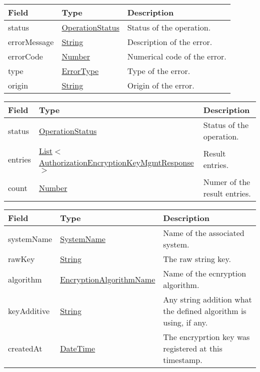 \documentclass[a4paper]{arrowhead}
\newcommand{\pref}[1]{{\textcolor{ArrowheadGrey}{\hyperref[sec:model:primitives:#1]{#1}}}}
\begin{document}

\begin{table}[ht!]
\begin{tabularx}{\textwidth}{| p{4.25cm} | p{3.5cm} | X |} \hline
\rowcolor{gray!33} Field & Type      & Description \\ \hline
status & \pref{OperationStatus} & Status of the operation. \\ \hline
errorMessage & \pref{String} & Description of the error. \\ \hline
errorCode &\pref{Number}  & Numerical code of the error. \\ \hline
type & \pref{ErrorType} & Type of the error. \\ \hline
origin & \pref{String} & Origin of the error. \\ \hline
\end{tabularx}
\end{table}


\begin{table}[ht!]
\begin{tabularx}{\textwidth}{| p{2cm} | p{7.8cm} | X |} \hline
\rowcolor{gray!33} Field & Type & Description \\ \hline
status & \pref{OperationStatus} & Status of the operation. \\ \hline
entries & \pref{List}$<$\hyperref[sec:model:AuthorizationEncryptionKeyMgmtResponse]{AuthorizationEncryptionKeyMgmtResponse}$>$ & Result entries. \\ \hline
count & \pref{Number} & Numer of the result entries. \\ \hline
\end{tabularx}
\end{table}

\clearpage


\begin{table}[ht!]
\begin{tabularx}{\textwidth}{| p{4.25cm} | p{4.5cm} | X |} \hline
\rowcolor{gray!33} Field & Type & Description \\ \hline
systemName & \pref{SystemName} & Name of the associated system. \\ \hline
rawKey & \pref{String} & The raw string key. \\ \hline
algorithm & \pref{EncryptionAlgorithmName} & Name of the ecnryption algorithm. \\ \hline
keyAdditive & \pref{String} & Any string addition what the defined algorithm is using, if any. \\ \hline
createdAt & \pref{DateTime} & The encryprtion key was registered at this timestamp. \\ \hline
\end{tabularx}
\end{table}
\end{document}
